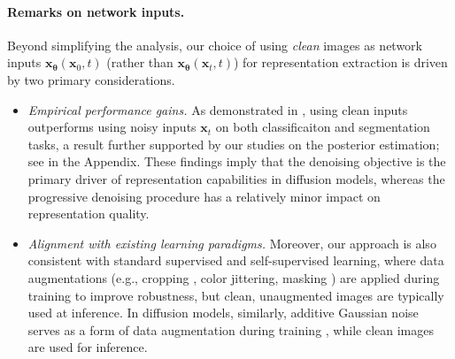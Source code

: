 \paragraph{Remarks on network inputs.} Beyond simplifying the analysis, our choice of using \emph{clean} images as network inputs $\bm x_{\bm \theta}(\bm x_0,t)$ (rather than $\bm x_{\bm \theta}(\bm x_t,t)$) for representation extraction is driven by two primary considerations.
\begin{itemize}[leftmargin=*]
    \item \emph{Empirical performance gains.} As demonstrated in , using clean inputs outperforms using noisy inputs $\bm x_t$ on both classificaiton and segmentation tasks, a result further supported by our studies on the posterior estimation; see  in the Appendix. These findings imply that the denoising objective is the primary driver of representation capabilities in diffusion models, whereas the progressive denoising procedure has a relatively minor impact on representation quality.
    \item \emph{Alignment with existing learning paradigms.} Moreover, our approach is also consistent with standard supervised and self-supervised learning, where data augmentations (e.g., cropping \citep{caron2021emerging}, color jittering, masking \citep{he2022masked}) are applied during training to improve robustness, but clean, unaugmented images are typically used at inference. In diffusion models, similarly, additive Gaussian noise serves as a form of data augmentation during training \citep{chen2024deconstructing}, while clean images are used for inference.
\end{itemize}






